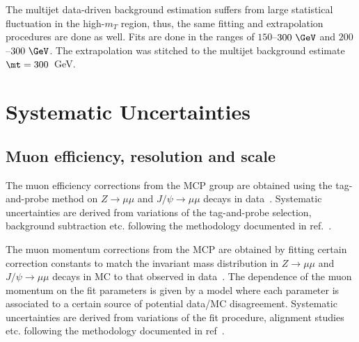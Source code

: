 The multijet data-driven background estimation suffers from large statistical fluctuation in the high-$m_T$ region, thus, the same fitting and extrapolation procedures are done as well.
Fits are done in the ranges of $150$--$300~\GeV$ and $200$--$300~\GeV$.
The extrapolation was stitched to the multijet background estimate $\mt=300$~GeV.



\section{Systematic Uncertainties}
\label{sec:wprimeSystematics}
\subsection{Muon efficiency, resolution and scale}
The muon efficiency corrections from the MCP group are obtained using the tag-and-probe method
on $Z\to\mu\mu$ and $J/\psi\to\mu\mu$ decays in data~\cite{MCP13TeV}. Systematic uncertainties
are derived from variations of the tag-and-probe selection, background subtraction etc. following
the methodology documented in ref.~\cite{MCPrun1}.

The muon momentum corrections from the MCP are obtained by fitting certain correction constants 
to match the invariant mass distribution in $Z\to\mu\mu$ and $J/\psi\to\mu\mu$ decays in MC
to that observed in data~\cite{MCP13TeV}. The dependence of the muon momentum on the fit parameters
is given by a model where each parameter is associated to a certain source of potential data/MC disagreement.
Systematic uncertainties are derived from variations of the fit procedure, alignment studies etc. 
following the methodology documented in ref~\cite{MCPrun1}.

